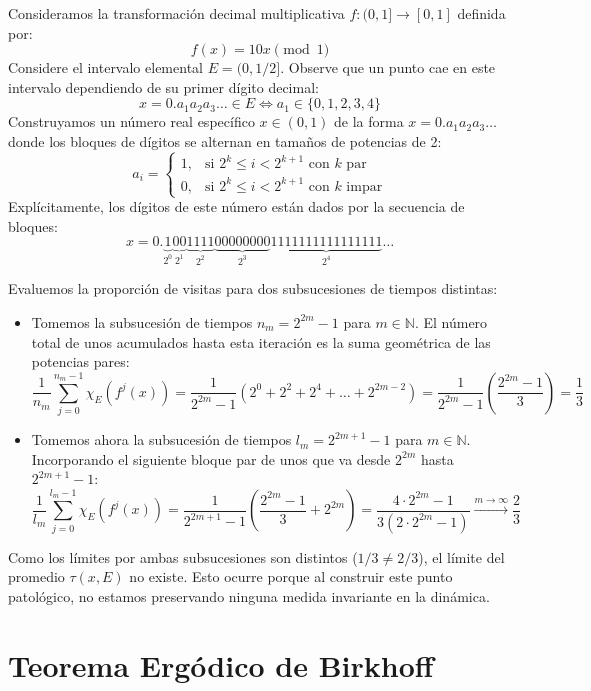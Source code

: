 \begin{ejemplo}
	Consideramos la transformación decimal multiplicativa $f: (0, 1] \to [0, 1]$ definida por:
	$$ f(x) = 10x \pmod 1 $$
	Considere el intervalo elemental $E = (0, 1/2]$. Observe que un punto cae en este intervalo dependiendo de su primer dígito decimal:
	$$ x = 0.a_1 a_2 a_3 \dots \in E \iff a_1 \in \{0, 1, 2, 3, 4\} $$
	Construyamos un número real específico $x \in (0,1)$ de la forma $x = 0.a_1 a_2 a_3 \dots$ donde los bloques de dígitos se alternan en tamaños de potencias de 2:
	$$ a_i = \begin{cases} 1, & \text{si } 2^k \le i < 2^{k+1} \text{ con } k \text{ par} \\ 0, & \text{si } 2^k \le i < 2^{k+1} \text{ con } k \text{ impar} \end{cases} $$
	Explícitamente, los dígitos de este número están dados por la secuencia de bloques:
	$$ x = 0.\underbrace{1}_{2^0} \underbrace{00}_{2^1} \underbrace{1111}_{2^2} \underbrace{00000000}_{2^3} \underbrace{1111111111111111}_{2^4} \dots $$
	
	Evaluemos la proporción de visitas para dos subsucesiones de tiempos distintas:
	\begin{itemize}
		\item Tomemos la subsucesión de tiempos $n_m = 2^{2m}-1$ para $m \in \mathbb{N}$. El número total de unos acumulados hasta esta iteración es la suma geométrica de las potencias pares:
		$$ \frac{1}{n_m} \sum_{j=0}^{n_m-1} \chi_E(f^j(x)) = \frac{1}{2^{2m}-1} (2^0 + 2^2 + 2^4 + \dots + 2^{2m-2}) = \frac{1}{2^{2m}-1} \left( \frac{2^{2m}-1}{3} \right) = \frac{1}{3} $$
		\item Tomemos ahora la subsucesión de tiempos $l_m = 2^{2m+1}-1$ para $m \in \mathbb{N}$. Incorporando el siguiente bloque par de unos que va desde $2^{2m}$ hasta $2^{2m+1}-1$:
		$$ \frac{1}{l_m} \sum_{j=0}^{l_m-1} \chi_E(f^j(x)) = \frac{1}{2^{2m+1}-1} \left( \frac{2^{2m}-1}{3} + 2^{2m} \right) = \frac{4 \cdot 2^{2m}-1}{3(2 \cdot 2^{2m}-1)} \xrightarrow{m \to \infty} \frac{2}{3} $$
	\end{itemize}
	Como los límites por ambas subsucesiones son distintos ($1/3 \neq 2/3$), el límite del promedio $\tau(x, E)$ no existe. Esto ocurre porque al construir este punto patológico, no estamos preservando ninguna medida invariante en la dinámica.
\end{ejemplo}

\section{Teorema Ergódico de Birkhoff}

